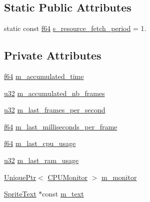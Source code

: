 \subsection*{Static Public Attributes}
\begin{DoxyCompactItemize}
\item 
static const \hyperlink{namespacemage_ab935747c6941320bd6214b5a5f265b09}{f64} \hyperlink{classmage_1_1_stats_script_aa8bf779ba6533bf97c5b72f1ff3b8da0}{s\+\_\+resource\+\_\+fetch\+\_\+period} = 1.
\end{DoxyCompactItemize}
\subsection*{Private Attributes}
\begin{DoxyCompactItemize}
\item 
\hyperlink{namespacemage_ab935747c6941320bd6214b5a5f265b09}{f64} \hyperlink{classmage_1_1_stats_script_a01b747da488fb1f574ca6ccf1608d706}{m\+\_\+accumulated\+\_\+time}
\item 
\hyperlink{namespacemage_af2b398bf98eb10351f49cad73fe2cc73}{u32} \hyperlink{classmage_1_1_stats_script_ab6b95146456616157183550428818427}{m\+\_\+accumulated\+\_\+nb\+\_\+frames}
\item 
\hyperlink{namespacemage_af2b398bf98eb10351f49cad73fe2cc73}{u32} \hyperlink{classmage_1_1_stats_script_aa569c7189cb063b814bcd88b56755b6c}{m\+\_\+last\+\_\+frames\+\_\+per\+\_\+second}
\item 
\hyperlink{namespacemage_ab935747c6941320bd6214b5a5f265b09}{f64} \hyperlink{classmage_1_1_stats_script_adceb6cdfd28d564d3354d1f42265dea6}{m\+\_\+last\+\_\+milliseconds\+\_\+per\+\_\+frame}
\item 
\hyperlink{namespacemage_ab935747c6941320bd6214b5a5f265b09}{f64} \hyperlink{classmage_1_1_stats_script_a01cf9681c11ee035b70b85b2976a82c6}{m\+\_\+last\+\_\+cpu\+\_\+usage}
\item 
\hyperlink{namespacemage_af2b398bf98eb10351f49cad73fe2cc73}{u32} \hyperlink{classmage_1_1_stats_script_a9e4957d023570b929922659be559e554}{m\+\_\+last\+\_\+ram\+\_\+usage}
\item 
\hyperlink{namespacemage_a3316d7143a973e37adf1110f2e80ca31}{Unique\+Ptr}$<$ \hyperlink{classmage_1_1_c_p_u_monitor}{C\+P\+U\+Monitor} $>$ \hyperlink{classmage_1_1_stats_script_a12e321d8fe1003de3643c4b799dd4c8f}{m\+\_\+monitor}
\item 
\hyperlink{classmage_1_1_sprite_text}{Sprite\+Text} $\ast$const \hyperlink{classmage_1_1_stats_script_a15f95a755a20b01a80df24a8c073b6c5}{m\+\_\+text}
\end{DoxyCompactItemize}
